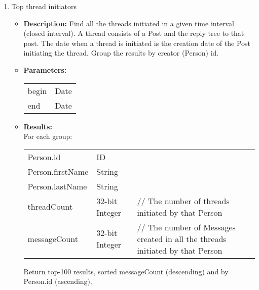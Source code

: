 {\begin{enumerate}
                  \item Top thread initiators
                    \begin{itemize}
                      \item \textbf{Description:}
                        Find all the threads initiated in a given time interval (closed interval).  A thread consists of
                        a Post and the reply tree to that post. The date when a thread is initiated is the creation date
                        of the Post initiating the thread. Group the results by creator (Person) id.
                      \item \textbf{Parameters:} \\
                        \begin{tabular}{ll}
                          begin & Date \\
                          end & Date \\
                        \end{tabular}
                      \item \textbf{Results:} \\
                        For each group:
                        \begin{tabular}{lll}
                          Person.id & ID & \\
                          Person.firstName & String & \\
                          Person.lastName & String & \\
                          threadCount & 32-bit Integer & \parbox[t]{20cm}{ // The number of threads initiated by that
                            Person \strut} \\
                          messageCount & 32-bit Integer & \parbox[t]{20cm}{ // The number of Messages created in all the
                            threads initiated by that Person \strut} \\
                        \end{tabular}
                        Return top-100 results, sorted messageCount (descending) and by Person.id (ascending).
                    \end{itemize}


\end{enumerate}}
